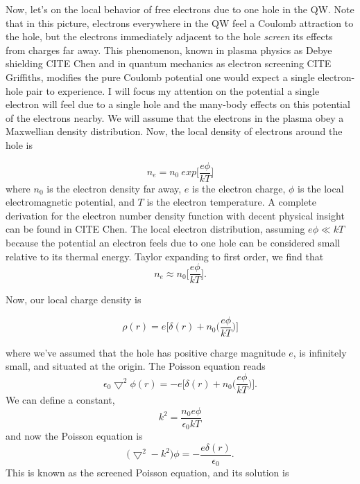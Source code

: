 \indent Now, let's on the local behavior of free electrons due to one hole in the QW. Note that in this picture, electrons everywhere in the QW feel a Coulomb attraction to the hole, but the electrons immediately adjacent to the hole \textit{screen} its effects from charges far away. This phenomenon, known in plasma physics as Debye shielding CITE Chen and in quantum mechanics as electron screening CITE Griffiths, modifies the pure Coulomb potential one would expect a single electron-hole pair to experience. I will focus my attention on the potential a single electron will feel due to a single hole and the many-body effects on this potential of the electrons nearby. We will assume that the electrons in the plasma obey a Maxwellian density distribution. Now, the local density of electrons around the hole is 

\begin{equation}
n_e = n_{0}~ exp \Big[ \frac{e\phi}{k T}\Big]
\end{equation}
where $n_{0}$ is the electron density far away, $e$ is the electron charge, $\phi$ is the local electromagnetic potential, and  $T$ is the electron temperature. A complete derivation for the electron number density function with decent physical insight can be found in CITE Chen. The local electron distribution, assuming $e\phi \ll kT$ because the potential an electron feels due to one hole can be considered small relative to its thermal energy. Taylor expanding to first order, we find that
\begin{equation}
n_e \approx n_0 \Big[ \frac{e\phi}{k T}\Big ].
\end{equation}

 Now, our local charge density is 
 

\begin{equation}
\rho(r) = e \Big [ \delta(r) + n_0 \Big( \frac{e\phi}{k T}\Big ) \Big]
\end{equation}

where we've assumed that the hole has positive charge magnitude $e$, is infinitely small, and situated at the origin. The Poisson equation reads
\begin{equation} \label{pois}
\epsilon_0 \bigtriangledown^2 \phi(r) = -e \Big [ \delta(r) + n_0 \Big( \frac{e\phi}{k T}\Big ) \Big].
\end{equation}
We can define a constant, 
\begin{equation}
k^2 = \frac{n_0 e\phi}{\epsilon_0 k T}
\end{equation}
and now the Poisson equation is
\begin{equation}
\big(\bigtriangledown^2 - k^2 \big) \phi = - \frac{e \delta(r)}{\epsilon_0}.
\end{equation}
This is known as the screened Poisson equation, and its solution is

